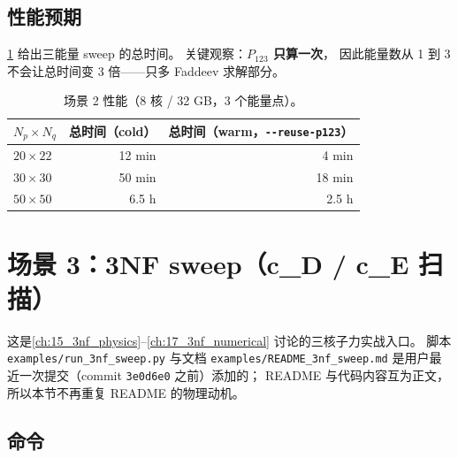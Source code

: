 \subsection{性能预期}
\label{sec:ch20-s2-perf}

\cref{tab:ch20-s2-perf} 给出三能量 sweep 的总时间。
关键观察：\textbf{$P_{123}$ 只算一次}，
因此能量数从 1 到 3 不会让总时间变 3 倍——只多 Faddeev 求解部分。

\begin{table}[ht]
\centering
\small
\caption{场景 2 性能（8 核 / 32 GB，3 个能量点）。}
\label{tab:ch20-s2-perf}
\begin{tabular}{@{}lrr@{}}
\toprule
$N_p \times N_q$ & 总时间（cold） & 总时间（warm，\texttt{-{}-reuse-p123}） \\
\midrule
$20 \times 22$  & 12 min  & 4 min   \\
$30 \times 30$  & 50 min  & 18 min  \\
$50 \times 50$  & 6.5 h   & 2.5 h   \\
\bottomrule
\end{tabular}
\end{table}

\section{场景 3：3NF sweep（c\_D / c\_E 扫描）}
\label{sec:ch20-scenario-3nf}

这是\cref{ch:15_3nf_physics}--\cref{ch:17_3nf_numerical}
讨论的三核子力实战入口。
脚本 \texttt{examples/run\_3nf\_sweep.py} 与文档 \texttt{examples/README\_3nf\_sweep.md}
是用户最近一次提交（commit \texttt{3e0d6e0} 之前）添加的；
README 与代码内容互为正文，
所以本节不再重复 README 的物理动机。

\subsection{命令}
\label{sec:ch20-s3-cmd}

